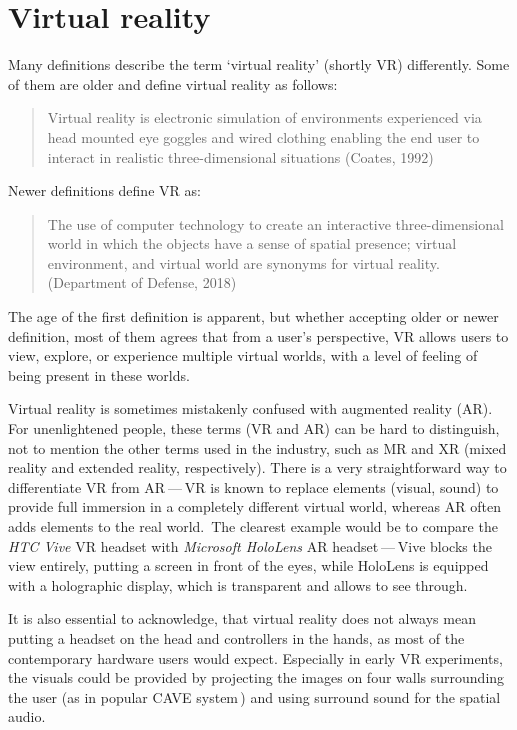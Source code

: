 \chapter{Virtual reality}\label{virtualreality}

Many definitions describe the term `virtual reality' (shortly VR) differently.
Some of them are older and define virtual reality as follows:

\begin{quotation}
Virtual reality is electronic simulation of environments experienced via
head mounted eye goggles and wired clothing enabling the end user to interact
in realistic three-dimensional situations (Coates, 1992)\,\cite{dvrddt}
\end{quotation}

Newer definitions define VR as:

\begin{quotation}
The use of computer technology to create an interactive three-dimensional
world in which the objects have a sense of spatial presence;
virtual environment, and virtual world are synonyms for virtual reality.
(Department of Defense, 2018)\,\cite{dvrddt}
\end{quotation}

The age of the first definition is apparent, but whether accepting older or newer
definition, most of them agrees that from a user's perspective, VR allows
users to view, explore, or experience multiple virtual worlds, with a level of 
feeling of being present in these worlds.

Virtual reality is sometimes mistakenly confused with augmented reality (AR).
For unenlightened people, these terms (VR and AR) can be hard to distinguish,
not to mention the other terms used in the industry, such as MR and XR
(mixed reality and extended reality, respectively). There is a very straightforward
way to differentiate VR from AR — VR is known to replace elements
(visual, sound) to provide full immersion in a completely different virtual
world, whereas AR often adds elements to the real world.\,\cite{vrar}
The clearest example would be to compare the \emph{HTC Vive} VR headset with
\emph{Microsoft HoloLens} AR headset — Vive blocks the view entirely, putting
a screen in front of the eyes, while HoloLens is equipped with a holographic
display, which is transparent and allows to see through.

It is also essential to acknowledge, that virtual reality does not always mean
putting a headset on the head and controllers in the hands, as most of the
contemporary hardware users would expect. Especially in
early VR experiments, the visuals could be provided by projecting the images
on four walls surrounding the user (as in popular CAVE system\,\cite{cave}) and
using surround sound for the spatial audio.

